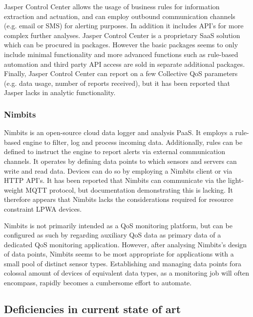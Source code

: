 Jasper Control Center allows the usage of business rules for information extraction and actuation, and can employ outbound communication channels (e.g. email or SMS) for alerting purposes.  In addition it includes API's for more complex further analyses. Jasper Control Center is a proprietary SaaS solution which can be procured in packages. However the basic packages seems to only include minimal functionality and more advanced functions such as rule-based automation and third party API access are sold in separate additional packages\cite{cisco_jasper}. Finally, Jasper Control Center can report on a few Collective QoS parameters (e.g. data usage, number of reports received), but it has been reported that Jasper lacks in analytic functionality\cite{forrester}.

\subsubsection*{Nimbits}
Nimbits\cite{web:nimbits} is an open-source cloud data logger and analysis PaaS. It employs a rule-based engine to filter, log and process incoming data. Additionally, rules can be defined to instruct the engine to report alerts via external communication channels. It operates by defining data points to which sensors and servers can write and read data\cite{study_of_various, nimbits_mqtt}. Devices can do so by employing a Nimbits client or via HTTP API's. It has been reported that Nimbits can communicate via the light-weight MQTT protocol\cite{nimbits_mqtt}, but documentation demonstrating this is lacking. It therefore appears that Nimbits lacks the considerations required for resource constraint LPWA devices.

Nimbits is not primarily intended as a QoS monitoring platform, but can be configured as such by regarding auxiliary QoS data as primary data of a dedicated QoS monitoring application. However, after analysing Nimbits's design of data points, Nimbits seems to be most appropriate for applications with a small pool of distinct sensor types. Establishing and managing data points fora colossal amount of devices of equivalent data types, as a monitoring job will often encompass, rapidly becomes a cumbersome effort to automate.

\subsection{Deficiencies in current state of art}
